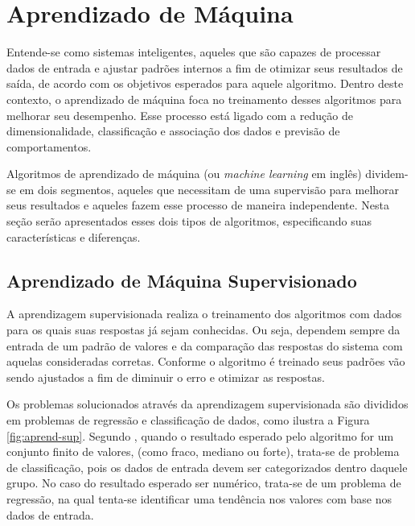 \documentclass[oneside,openright,12pt]{ufsm_2015} %
\begin{document}

\section{Aprendizado de Máquina}
\label{sec:fund-aprend-maquina}

    \par Entende-se como sistemas inteligentes, aqueles que são capazes de processar dados de entrada e ajustar padrões internos a fim de otimizar seus resultados de saída, de acordo com os objetivos esperados para aquele algoritmo. Dentro deste contexto, o aprendizado de máquina foca no treinamento desses algoritmos para melhorar seu desempenho. Esse processo está ligado com a redução de dimensionalidade, classificação e associação dos dados e previsão de comportamentos.

    \par Algoritmos de aprendizado de máquina (ou \textit{machine learning} em inglês) dividem-se em dois segmentos, aqueles que necessitam de uma supervisão para melhorar seus resultados e aqueles fazem esse processo de maneira independente. Nesta seção serão apresentados esses dois tipos de algoritmos, especificando suas características e diferenças.


\subsection{Aprendizado de Máquina Supervisionado}
\label{sec:fund-am-sup}

    \par A aprendizagem supervisionada realiza o treinamento dos algoritmos com dados para os quais suas respostas já sejam conhecidas. Ou seja, dependem sempre da entrada de um padrão de valores e da comparação das respostas do sistema com aquelas consideradas corretas. Conforme o algoritmo é treinado seus padrões vão sendo ajustados a fim de diminuir o erro e otimizar as respostas. 

    \par Os problemas solucionados através da aprendizagem supervisionada são divididos em problemas de regressão e classificação de dados, como ilustra a Figura \ref{fig:aprend-sup}. Segundo \cite{book:russell:10}, quando o resultado esperado pelo algoritmo for um conjunto finito de valores, (como fraco, mediano ou forte), trata-se de problema de classificação, pois os dados de entrada devem ser categorizados dentro daquele grupo. No caso do resultado esperado ser numérico, trata-se de um problema de regressão, na qual tenta-se identificar uma tendência nos valores com base nos dados de entrada.
\end{document}
